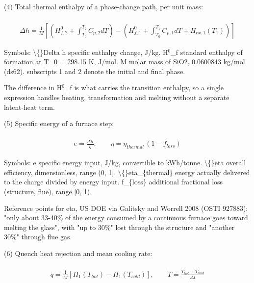 \documentclass[10pt,a4paper,twoside]{report}
\begin{document}
(4) Total thermal enthalpy of a phase-change path, per unit mass:

\begin{equation*}
\begin{gathered}
\\ \Delta h = \frac{1}{M}\left[\left(H^0_{f,2} + \int_{T_0}^{T_2} C_{p,2}dT\right) - \left(H^0_{f,1} + \int_{T_0}^{T_1} C_{p,1}dT + H_{ex,1}(T_1)\right)\right]
\end{gathered}
\end{equation*}

Symbols: \textbackslash\{\}Delta h   specific enthalpy change, J/kg. H$^{0}$\_f      standard enthalpy of formation at T\_0 = 298.15 K, J/mol. M          molar mass of SiO2, 0.0600843 kg/mol (ds62). subscripts 1 and 2 denote the initial and final phase.

The difference in H$^{0}$\_f is what carries the transition enthalpy, so a single expression handles heating, transformation and melting without a separate latent-heat term.

(5) Specific energy of a furnace step:

\begin{equation*}
\begin{gathered}
\\ e = \frac{\Delta h}{\eta}, \qquad \eta = \eta_{thermal}\,(1 - f_{loss})
\end{gathered}
\end{equation*}

Symbols: e                specific energy input, J/kg, convertible to kWh/tonne. \textbackslash\{\}eta             overall efficiency, dimensionless, range (0, 1]. \textbackslash\{\}eta\_\{thermal\}   energy actually delivered to the charge divided by energy input. f\_\{loss\}         additional fractional loss (structure, flue), range [0, 1).

Reference points for eta, US DOE via Galitsky and Worrell 2008 (OSTI 927883): "only about 33-40\% of the energy consumed by a continuous furnace goes toward melting the glass", with "up to 30\%" lost through the structure and "another 30\%" through flue gas.

(6) Quench heat rejection and mean cooling rate:

\begin{equation*}
\begin{gathered}
\\ q = \frac{1}{M}\left[H_1(T_{hot}) - H_1(T_{cold})\right], \qquad \dot{T} = \frac{T_{hot} - T_{cold}}{\Delta t}
\end{gathered}
\end{equation*}
\end{document}
